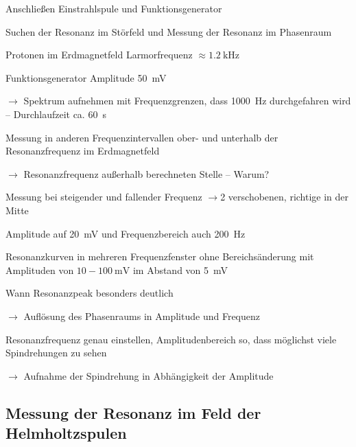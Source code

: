 \documentclass[paper=a4,
	fontsize=10pt,
	DIV=18,
	twocolumn,
	parskip=half
	]{scrartcl}
\numberwithin{equation}{section}    %
\newcommand{\tra}{$\rightarrow $}
\begin{document}
\begin{compactitem}
	\item Anschließen Einstrahlspule und Funktionsgenerator
	\item Suchen der Resonanz im Störfeld und Messung der Resonanz im Phasenraum
	\item Protonen im Erdmagnetfeld Larmorfrequenz $\approx \SI{1.2}{\kilo\hertz}$
	\item Funktionsgenerator Amplitude \SI{50}{\milli\volt}
	\item[\tra] Spektrum aufnehmen mit Frequenzgrenzen, dass \SI{1000}{\hertz} durchgefahren wird \--- Durchlaufzeit ca. \SI{60}{\second}
	\item Messung in anderen Frequenzintervallen ober- und unterhalb der Resonanzfrequenz im Erdmagnetfeld 
	\item[\tra] Resonanzfrequenz außerhalb berechneten Stelle \--- Warum?
	\item Messung bei steigender und fallender Frequenz \tra 2 verschobenen, richtige in der Mitte
	\item Amplitude auf \SI{20}{\milli\volt} und Frequenzbereich auch \SI{200}{\hertz}
	\item Resonanzkurven in mehreren Frequenzfenster ohne Bereichsänderung mit Amplituden von $10-\SI{100}{\milli\volt}$ im Abstand von \SI{5}{\milli\volt}
	\item Wann Resonanzpeak besonders deutlich
	\item[\tra] Auflösung des Phasenraums in Amplitude und Frequenz
	\item Resonanzfrequenz genau einstellen, Amplitudenbereich so, dass möglichst viele Spindrehungen zu sehen
	\item[\tra] Aufnahme der Spindrehung in Abhängigkeit der Amplitude
\end{compactitem}


\subsection{Messung der Resonanz im Feld der Helmholtzspulen}
\label{vorbereitung6}

\begin{compactitem}
	\item 
\end{compactitem}
\end{document}
